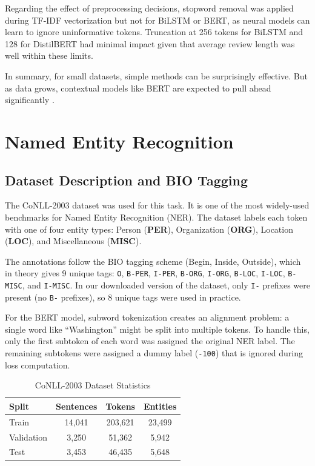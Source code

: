 \documentclass[12pt,a4paper]{article}
\begin{document}
Regarding the effect of preprocessing decisions, stopword removal
was applied during TF-IDF vectorization but not for BiLSTM or BERT,
as neural models can learn to ignore uninformative tokens. Truncation
at 256 tokens for BiLSTM and 128 for DistilBERT had minimal impact
given that average review length was well within these limits.

In summary, for small datasets, simple methods can be surprisingly effective.
But as data grows, contextual models like BERT are expected to pull ahead
significantly \cite{devlin2019bert}.

\section{Named Entity Recognition}

\subsection{Dataset Description and BIO Tagging}

The CoNLL-2003 dataset \cite{tjong2003conll} was used for this task. It is one
of the most widely-used benchmarks for Named Entity Recognition (NER). The
dataset labels each token with one of four entity types: Person (\textbf{PER}),
Organization (\textbf{ORG}), Location (\textbf{LOC}), and Miscellaneous
(\textbf{MISC}).

The annotations follow the BIO tagging scheme (Begin, Inside, Outside),
which in theory gives 9 unique tags: \texttt{O}, \texttt{B-PER},
\texttt{I-PER}, \texttt{B-ORG}, \texttt{I-ORG}, \texttt{B-LOC},
\texttt{I-LOC}, \texttt{B-MISC}, and \texttt{I-MISC}. In our downloaded
version of the dataset, only \texttt{I-} prefixes were present (no \texttt{B-}
prefixes), so 8 unique tags were used in practice.

For the BERT model, subword tokenization creates an alignment problem: a single
word like ``Washington'' might be split into multiple tokens. To handle this,
only the first subtoken of each word was assigned the original NER label. The
remaining subtokens were assigned a dummy label (\texttt{-100}) that is ignored
during loss computation.

\begin{table}[H]
    \centering
    \caption{CoNLL-2003 Dataset Statistics}
    \begin{tabular}{lccc}
        \toprule
        \textbf{Split} & \textbf{Sentences} & \textbf{Tokens} & \textbf{Entities} \\
        \midrule
        Train      & 14{,}041 & 203{,}621 & 23{,}499 \\
        Validation &  3{,}250 &  51{,}362 &  5{,}942 \\
        Test       &  3{,}453 &  46{,}435 &  5{,}648 \\
        \bottomrule
    \end{tabular}
    \label{tab:q2_dataset}
\end{table}
\end{document}
